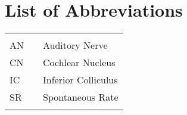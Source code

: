 
\tableofcontents
\cleardoublepage{}


\newpage
\listoffigures
\cleardoublepage{}

\chapter*{List of Abbreviations}
\begin{center}
  \begin{tabular}{lll}
    \hspace*{2em} & \hspace*{1in} & \hspace*{4.5in} \\
    AN    & \dotfill & Auditory Nerve  \\
    CN    &  \dotfill & Cochlear Nucleus \\
    IC 	& \dotfill & Inferior Colliculus \\
    SR    & \dotfill & Spontaneous Rate \\
    
       & \dotfill &  \\
  \end{tabular}
\end{center}
\cleardoublepage{}


\newpage
\endofprelim{}